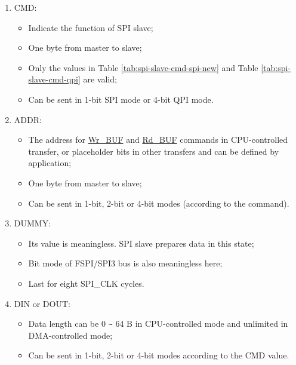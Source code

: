 \documentclass[main\_\_EN.tex]{subfiles}
\begin{document}
\begin{enumerate}
   \item CMD:
        \begin{itemize}
            \item Indicate the function of SPI slave;
            \item One byte from master to slave;
            \item Only the values in Table \ref{tab:spi-slave-cmd-spi-new} and Table \ref{tab:spi-slave-cmd-qpi} are valid;
            \item Can be sent in 1-bit SPI mode or 4-bit QPI mode.
        \end{itemize}

   \item ADDR:
        \begin{itemize}
            \item The address for \hyperlink{cmd:wrbuf}{Wr\_BUF} and \hyperlink{cmd:rdbuf}{Rd\_BUF} commands in CPU-controlled transfer, or placeholder bits in other transfers and can be defined by application;
            \item One byte from master to slave;
            \item Can be sent in 1-bit, 2-bit or 4-bit modes (according to the command).
        \end{itemize}

   \item DUMMY:
        \begin{itemize}
            \item Its value is meaningless. SPI slave prepares data in this state;
            \item Bit mode of FSPI/SPI3 bus is also meaningless here;
            \item Last for eight SPI\_CLK cycles.
        \end{itemize}

   \item DIN or DOUT:

        \begin{itemize}
            \item Data length can be 0 \verb+~+ 64 B in CPU-controlled mode and unlimited in DMA-controlled mode;
            \item Can be sent in 1-bit, 2-bit or 4-bit modes according to the CMD value.
        \end{itemize}

   \end{enumerate}
\end{document}
